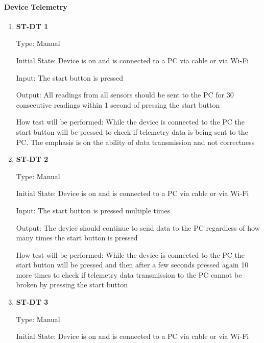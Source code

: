 \documentclass[12pt, titlepage]{article}
\begin{document}
\paragraph{Device Telemetry}	
\begin{enumerate}

  \item{\bf{ST-DT 1}}
  
  Type: Manual
            
  Initial State: Device is on and is connected to a PC via cable or via Wi-Fi
            
  Input: The start button is pressed
            
  Output: All readings from all sensors should be sent to the PC for 30 consecutive readings within 1 second of pressing the start button
  
            
  How test will be performed: While the device is connected to the PC the start button will be pressed to check if telemetry data is being sent to the PC. The emphasis is on the ability of data transmission and not correctness\\

  \item{\bf{ST-DT 2}}
  
  Type: Manual
            
  Initial State: Device is on and is connected to a PC via cable or via Wi-Fi
            
  Input: The start button is pressed multiple times
            
  Output: The device should continue to send data to the PC regardless of how many times the start button is pressed
  
            
  How test will be performed: While the device is connected to the PC the start button will be pressed and then after a few seconds pressed again 10 more times to check if telemetry data transmission to the PC cannot be broken by pressing the start button\\

  \item{\bf{ST-DT 3}}
  
  Type: Manual
            
  Initial State: Device is on and is connected to a PC via cable or via Wi-Fi
            

\end{enumerate}
\end{document}
